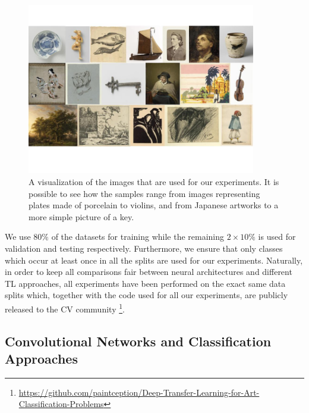 


\begin{figure}
\centering
  \includegraphics[width=10cm]{./Images/Chapter03/datasets.jpg}\vspace{-1cm}
  \caption{A visualization of the images that are used for our experiments. It is possible to see how the samples range from images representing plates made of porcelain to violins, and from Japanese artworks to a more simple picture of a key.}
  \label{fig:datasets}
\end{figure}

We use $80\%$ of the datasets for training while the remaining $2 \times 10\%$ is used for validation and testing respectively. Furthermore, we ensure that only classes which occur at least once in all the splits are used for our experiments. Naturally, in order to keep all comparisons fair between neural architectures and different TL approaches, all experiments have been performed on the exact same data splits which, together with the code used for all our experiments, are publicly released to the CV community \footnote{\url{https://github.com/paintception/Deep-Transfer-Learning-for-Art-Classification-Problems}}. 

\subsection{Convolutional Networks and Classification Approaches}
\label{subsec: neural_nets}

